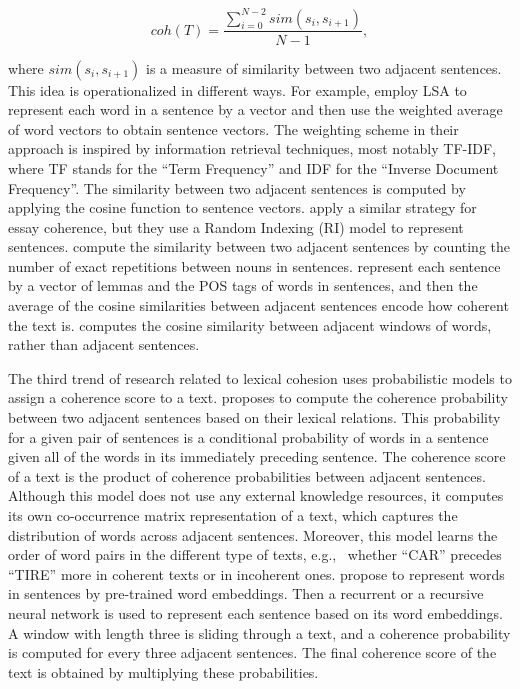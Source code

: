 \begin{equation}
coh(T) = \frac{\sum_{i=0}^{N-2}sim(s_i,s_{i+1})}{N-1},
\end{equation} 

where $sim(s_i, s_{i+1})$ is a measure of similarity between two adjacent sentences. 
This idea is operationalized in different ways.
For example,  employ LSA to represent each word in a sentence by a vector and then use the weighted average of word vectors to obtain sentence vectors. 
The weighting scheme in their approach is inspired by information retrieval techniques, most notably TF-IDF, where TF stands for the ``Term Frequency'' and IDF for the ``Inverse Document Frequency''.
The similarity between two adjacent sentences is computed by applying the cosine function to sentence vectors. 
 apply a similar strategy for essay coherence, but they use a Random Indexing (RI) model to represent sentences. 
 compute the similarity between two adjacent sentences by counting the number of exact repetitions between nouns in sentences. 
 represent each sentence by a vector of lemmas and the POS tags of words in sentences, and then the average of the cosine similarities between adjacent sentences encode how coherent the text is.  
 computes the cosine similarity between adjacent windows of words, rather than adjacent sentences. 

The third trend of research related to lexical cohesion uses probabilistic models to assign a coherence score to a text. 
 proposes to compute the coherence probability between two adjacent sentences based on their lexical relations. 
This probability for a given pair of sentences is a conditional probability of words in a sentence given all of the words in its immediately preceding sentence. 
The coherence score of a text is the product of coherence probabilities between adjacent sentences. 
Although this model does not use any external knowledge resources, it computes its own co-occurrence matrix representation of a text, which captures the distribution of words across adjacent sentences. 
Moreover, this model learns the order of word pairs in the different type of texts, e.g., \ whether ``CAR'' precedes ``TIRE'' more in coherent texts or in incoherent ones.  
 propose to represent words in sentences by pre-trained word embeddings. 
Then a recurrent \cite{schuster97} or a recursive neural network is used to represent each sentence based on its word embeddings. 
A window with length three is sliding through a text, and a coherence probability is computed for every three adjacent sentences.  
The final coherence score of the text is obtained by multiplying these probabilities. 

